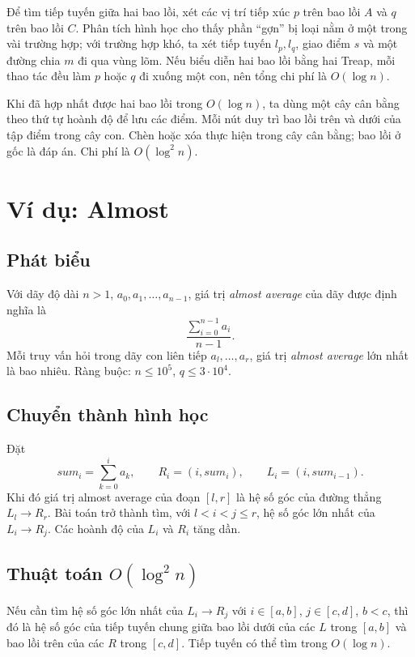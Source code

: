 \documentclass[11pt]{article}
\begin{document}
Để tìm tiếp tuyến giữa hai bao lồi, xét các vị trí tiếp xúc $p$ trên
bao lồi $A$ và $q$ trên bao lồi $C$. Phân tích hình học cho thấy phần
``gợn'' bị loại nằm ở một trong vài trường hợp; với trường hợp khó, ta
xét tiếp tuyến $l_p,l_q$, giao điểm $s$ và một đường chia $m$ đi qua
vùng lõm. Nếu biểu diễn hai bao lồi bằng hai Treap, mỗi thao tác đều
làm $p$ hoặc $q$ đi xuống một con, nên tổng chi phí là $O(\log n)$.

Khi đã hợp nhất được hai bao lồi trong $O(\log n)$, ta dùng một cây cân
bằng theo thứ tự hoành độ để lưu các điểm. Mỗi nút duy trì bao lồi trên
và dưới của tập điểm trong cây con. Chèn hoặc xóa thực hiện trong cây
cân bằng; bao lồi ở gốc là đáp án. Chi phí là $O(\log^2 n)$.

\section{Ví dụ: Almost}

\subsection{Phát biểu}

Với dãy độ dài $n>1$, $a_0,a_1,\ldots,a_{n-1}$, giá trị \textit{almost
average} của dãy được định nghĩa là
\[
  \frac{\sum_{i=0}^{n-1}a_i}{n-1}.
\]
Mỗi truy vấn hỏi trong dãy con liên tiếp $a_l,\ldots,a_r$, giá trị
\textit{almost average} lớn nhất là bao nhiêu. Ràng buộc:
$n\le 10^5$, $q\le 3\cdot 10^4$.

\subsection{Chuyển thành hình học}

Đặt
\[
  sum_i=\sum_{k=0}^{i}a_k,\qquad R_i=(i,sum_i),\qquad L_i=(i,sum_{i-1}).
\]
Khi đó giá trị almost average của đoạn $[l,r]$ là hệ số góc của đường
thẳng $L_l\to R_r$. Bài toán trở thành tìm, với $l<i<j\le r$, hệ số
góc lớn nhất của $L_i\to R_j$. Các hoành độ của $L_i$ và $R_i$ tăng
dần.

\subsection{\texorpdfstring{Thuật toán $O(\log^2 n)$}{Thuật toán O log bình phương n}}

Nếu cần tìm hệ số góc lớn nhất của $L_i\to R_j$ với
$i\in[a,b]$, $j\in[c,d]$, $b<c$, thì đó là hệ số góc của tiếp tuyến
chung giữa bao lồi dưới của các $L$ trong $[a,b]$ và bao lồi trên của
các $R$ trong $[c,d]$. Tiếp tuyến có thể tìm trong $O(\log n)$.
\end{document}
